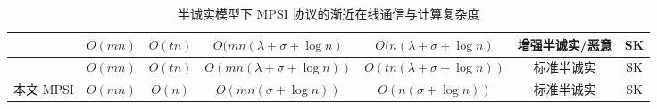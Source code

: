 \begin{table}[htbp]
{\begin{tabular}{|c|cc|cc|c|c|}
~\cite{NTY-CCS-2021} & \multicolumn{1}{c|}{$O(m n)$} & $O(t n)$ & \multicolumn{1}{c|}{$O(m n (\lambda + \sigma + \log n)$} & $O(n (\lambda + \sigma + \log n)$ & 增强半诚实/恶意 & SK \\ \hline
\cite{WuYC24} & \multicolumn{1}{c|}{$O(m n)$} & $O(t n)$ & \multicolumn{1}{c|}{$O(m n (\lambda + \sigma + \log n))$} & $O(t n (\lambda + \sigma + \log n))$ & 标准半诚实 & SK \\ \hline
本文 MPSI & \multicolumn{1}{c|}{$O(m n)$} & $O(n)$ & \multicolumn{1}{c|}{$O(m n (\sigma + \log n))$} & $O(n (\sigma + \log n))$ & 标准半诚实 & SK \\ \hline
\end{tabular}}
\caption{半诚实模型下 MPSI 协议的渐近在线通信与计算复杂度}
\label{tab:mpsi-comparisons}
\end{table}

\begin{table}[htbp]
\centering
{}
\caption{半诚实模型下 MPSI 协议的渐近离线通信与计算复杂度}
\label{tab:mpsi-offline-comparisons}
\end{table}

